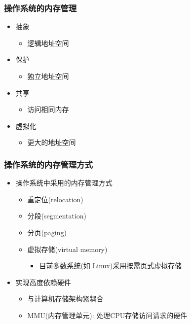 \begin{frame}[plain,t]
    
    \frametitle{操作系统的内存管理}
	\begin{itemize}
	    \item 抽象
		
	    \begin{itemize}
	        \item 逻辑地址空间
	    \end{itemize}
	    \item 保护
		
	    \begin{itemize}
	        \item 独立地址空间
	    \end{itemize}
	    \item 共享
		
	    \begin{itemize}
	        \item 访问相同内存
	    \end{itemize}
	    \item 虚拟化
		
	    \begin{itemize}
	        \item 更大的地址空间
	    \end{itemize}
	\end{itemize}
\end{frame}
\begin{frame}[plain,t]
    
    \frametitle{操作系统的内存管理方式}
	\begin{itemize}
	    \item 操作系统中采用的内存管理方式
	    \begin{itemize}
	        \item 重定位(relocation)
	        \item 分段(segmentation)
	        \item 分页(paging)
	        \item 虚拟存储(virtual memory)
		    \begin{itemize}
		        \item 目前多数系统(如 Linux)采用按需页式虚拟存储
		    \end{itemize}
	    \end{itemize}
	    \item 实现高度依赖硬件
	    \begin{itemize}
	        \item 与计算机存储架构紧耦合
	        \item MMU(内存管理单元): 处理CPU存储访问请求的硬件
	    \end{itemize}
	\end{itemize}
\end{frame}

